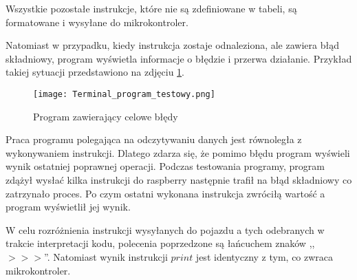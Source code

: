             Wszystkie pozostałe instrukcje, które nie są zdefiniowane w tabeli, są formatowane i wysyłane do mikrokontroler.

            Natomiast w przypadku, kiedy instrukcja zostaje odnaleziona, ale zawiera błąd składniowy, program wyświetla informacje o błędzie i przerwa działanie.
            Przykład takiej sytuacji przedstawiono na zdjęciu \ref{fig:interpreter}.

            \begin{figure}[!ht]
                \centering
                \texttt{[image: Terminal\_program\_testowy.png]}
                \caption{Program zawierający celowe błędy}
                \label{fig:interpreter}
            \end{figure}

            Praca programu polegająca na odczytywaniu danych jest równoległa z wykonywaniem instrukcji.
            Dlatego zdarza się, że pomimo błędu program wyświeli wynik ostatniej poprawnej operacji.
            Podczas testowania programy, program zdążył wysłać kilka instrukcji do raspberry następnie trafił na błąd składniowy co zatrzynało proces.
            Po czym ostatni wykonana instrukcja zwróciłą wartość a program wyświetlił jej wynik.

            W celu rozróżnienia instrukcji wysyłanych do pojazdu a tych odebranych w trakcie interpretacji kodu, polecenia poprzedzone są łańcuchem znaków ,,$>>>$''.
            Natomiast wynik instrukcji $print$ jest identyczny z tym, co zwraca mikrokontroler.
